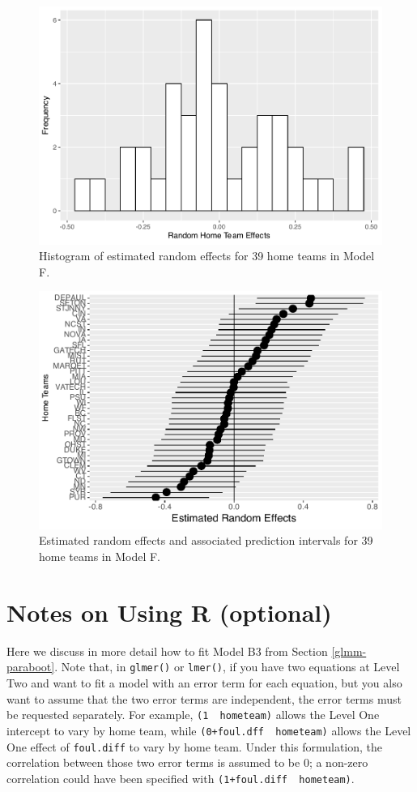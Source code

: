 \documentclass[
]{krantz}
\begin{document}
\begin{figure}

{\centering \includegraphics[width=0.6\linewidth]{bookdown-BeyondMLR_files/figure-latex/gmu-hist1-1} 

}

\caption{Histogram of estimated random effects for 39 home teams in Model F.}\label{fig:gmu-hist1}
\end{figure}

\begin{figure}

{\centering \includegraphics[width=0.6\linewidth]{bookdown-BeyondMLR_files/figure-latex/gmu-cis1-1} 

}

\caption{Estimated random effects and associated prediction intervals for 39 home teams in Model F.}\label{fig:gmu-cis1}
\end{figure}

\section{Notes on Using R (optional)}\label{usingR-glmm}

Here we discuss in more detail how to fit Model B3 from Section \ref{glmm-paraboot}. Note that, in \texttt{glmer()} or \texttt{lmer()}, if you have two equations at Level Two and want to fit a model with an error term for each equation, but you also want to assume that the two error terms are independent, the error terms must be requested separately. For example, \texttt{(1\ \textbar{}\ hometeam)} allows the Level One intercept to vary by home team, while \texttt{(0+foul.dff\ \textbar{}\ hometeam)} allows the Level One effect of \texttt{foul.diff} to vary by home team. Under this formulation, the correlation between those two error terms is assumed to be 0; a non-zero correlation could have been specified with \texttt{(1+foul.diff\ \textbar{}\ hometeam)}.
\end{document}
